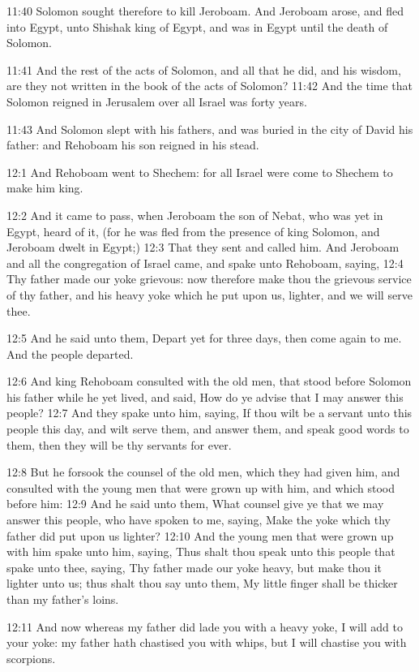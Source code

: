 11:40 Solomon sought therefore to kill Jeroboam. And Jeroboam arose, and fled into Egypt, unto Shishak king of Egypt, and was in Egypt until the death of Solomon.

11:41 And the rest of the acts of Solomon, and all that he did, and his wisdom, are they not written in the book of the acts of Solomon?  11:42 And the time that Solomon reigned in Jerusalem over all Israel was forty years.

11:43 And Solomon slept with his fathers, and was buried in the city of David his father: and Rehoboam his son reigned in his stead.

12:1 And Rehoboam went to Shechem: for all Israel were come to Shechem to make him king.

12:2 And it came to pass, when Jeroboam the son of Nebat, who was yet in Egypt, heard of it, (for he was fled from the presence of king Solomon, and Jeroboam dwelt in Egypt;) 12:3 That they sent and called him. And Jeroboam and all the congregation of Israel came, and spake unto Rehoboam, saying, 12:4 Thy father made our yoke grievous: now therefore make thou the grievous service of thy father, and his heavy yoke which he put upon us, lighter, and we will serve thee.

12:5 And he said unto them, Depart yet for three days, then come again to me. And the people departed.

12:6 And king Rehoboam consulted with the old men, that stood before Solomon his father while he yet lived, and said, How do ye advise that I may answer this people?  12:7 And they spake unto him, saying, If thou wilt be a servant unto this people this day, and wilt serve them, and answer them, and speak good words to them, then they will be thy servants for ever.

12:8 But he forsook the counsel of the old men, which they had given him, and consulted with the young men that were grown up with him, and which stood before him: 12:9 And he said unto them, What counsel give ye that we may answer this people, who have spoken to me, saying, Make the yoke which thy father did put upon us lighter?  12:10 And the young men that were grown up with him spake unto him, saying, Thus shalt thou speak unto this people that spake unto thee, saying, Thy father made our yoke heavy, but make thou it lighter unto us; thus shalt thou say unto them, My little finger shall be thicker than my father's loins.

12:11 And now whereas my father did lade you with a heavy yoke, I will add to your yoke: my father hath chastised you with whips, but I will chastise you with scorpions.

